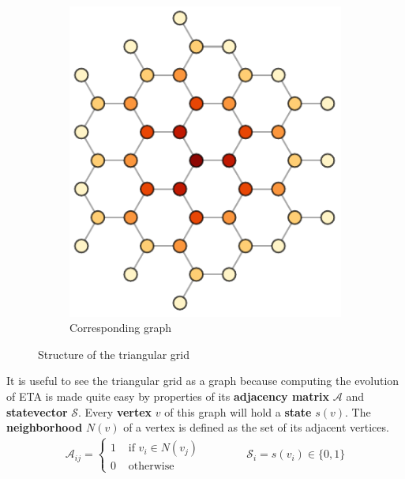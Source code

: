 \documentclass{article}
\begin{document}
\begin{figure}[H]
\begin{subfigure}[b]{0.35\textwidth}
         \includegraphics[width=\textwidth]{graphics/introduction/graph.pdf}
         \caption{Corresponding graph}
         \label{fig:graph}
     \end{subfigure}
        \caption{Structure of the triangular grid}
        \label{fig:structure-of-the-triangular-grid}
\end{figure}

 It is useful to see the triangular grid as a graph because computing the evolution of ETA is made quite easy by properties of its \textbf{adjacency matrix} $\mathcal{A}$ and \textbf{state}\linebreak\textbf{vector} $\mathcal{S}$. Every \textbf{vertex} $v$ of this graph will hold a \textbf{state} $s(v)$. The \textbf{neighborhood} $N(v)$ of a vertex is defined as the set of its adjacent vertices.
\begin{equation}
\begin{array}{ccc}
    \mathcal{A}_{ij}=
    \begin{cases}
        1 & \text{ if } v_i\in N(v_j) \\
        0 & \text{ otherwise}
    \end{cases}
&\hspace{1cm}&
    \mathcal{S}_i=s(v_i)\in\{0,1\}
\end{array}
\end{equation}
\end{document}
